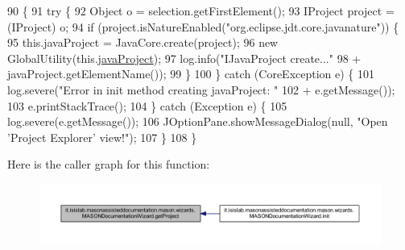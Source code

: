 \begin{DoxyCode}
90                                                            \{
91         \textcolor{keywordflow}{try} \{
92             Object o = selection.getFirstElement();
93             IProject project = (IProject) o;
94             \textcolor{keywordflow}{if} (project.isNatureEnabled(\textcolor{stringliteral}{"org.eclipse.jdt.core.javanature"})) \{
95                 this.javaProject = JavaCore.create(project);
96                 \textcolor{keyword}{new} GlobalUtility(this.\hyperlink{classit_1_1isislab_1_1masonassisteddocumentation_1_1mason_1_1wizards_1_1_m_a_s_o_n_documentation_wizard_a19679a26a6394a719262167ac2c7d0c2}{javaProject});
97                 log.info(\textcolor{stringliteral}{"IJavaProject create..."}
98                         + javaProject.getElementName());
99             \}
100         \} \textcolor{keywordflow}{catch} (CoreException e) \{
101             log.severe(\textcolor{stringliteral}{"Error in init method creating javaProject: "}
102                     + e.getMessage());
103             e.printStackTrace();
104         \} \textcolor{keywordflow}{catch} (Exception e) \{
105             log.severe(e.getMessage());
106             JOptionPane.showMessageDialog(null, \textcolor{stringliteral}{"Open 'Project Explorer' view!"});
107         \}
108     \}
\end{DoxyCode}


Here is the caller graph for this function\-:
\nopagebreak
\begin{figure}[H]
\begin{center}
\leavevmode
\includegraphics[width=350pt]{classit_1_1isislab_1_1masonassisteddocumentation_1_1mason_1_1wizards_1_1_m_a_s_o_n_documentation_wizard_ae51cfd5f549a5ad5758567f5d40621b7_icgraph}
\end{center}
\end{figure}


